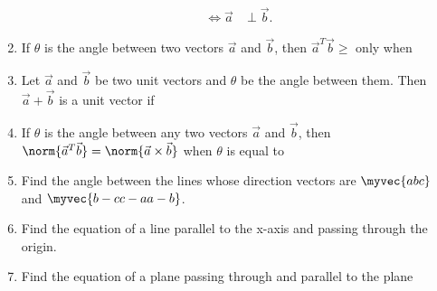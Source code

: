\begin{enumerate}[label=\arabic*.,ref=\thesubsection.\theenumi]
\begin{align}
\iff \vec{a}&\perp\vec{b}.
\end{align}
\item If $\theta$ is the angle between two vectors $\vec{a}$ and $\vec{b}$, then $\vec{a}^T\vec{b} \ge $ only when 
\begin{enumerate}[itemsep = 2pt]
\end{enumerate}
\item Let $\vec{a}$ and $\vec{b}$ be two unit vectors and $\theta$ be the angle between them.  Then $\vec{a}+\vec{b}$ is a unit vector if 
\begin{enumerate}[itemsep = 2pt]
\end{enumerate}
\item If $\theta$ is the angle between any two vectors $\vec{a}$ and $\vec{b}$, then 
$\norm{\vec{a}^T\vec{b}} = \norm{\vec{a} \times \vec{b}}$ when $\theta$ is equal to 
\begin{enumerate}[itemsep = 2pt]
\end{enumerate}
\item Find the angle between the lines whose direction vectors are $\myvec{abc}$ and $\myvec{b-cc-aa-b}$.
\item Find the equation of a line parallel to the x-axis and passing through the origin.
\item Find the equation of a plane passing through  and parallel to the plane 
%
\begin{align}

\end{align}
\end{enumerate}
